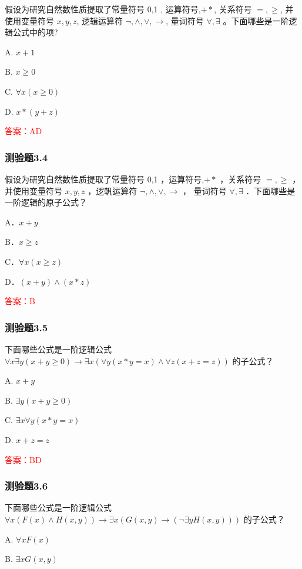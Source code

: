\documentclass[UTF8, heading=true]{ctexart}
\begin{document}
假设为研究自然数性质提取了常量符号 0,1 , 运算符号,$+ *$,
 关系符号 $=, \geq$, 并使用变量符号 $x, y, z$, 
 逻辑运算符 $\neg, \wedge, \vee, \rightarrow$, 量词符号 $\forall, \exists$ 。下面哪些是一阶逻辑公式中的项?

A. $ x+1$

B. $ x \geq 0$

C. $\forall x(x \geq 0)$

D. $ x *(y+z)$

\textcolor{red}{答案：AD}

\subsubsection{测验题3.4}

假设为研究自然数性质提取了常量符号 0,1 ，运算符号,$+ *$ ，关系符号 $=, \geq$ ，
并使用变量符号 $x, y, z$ ，逻軓运算符 $\neg, \wedge, \vee, \rightarrow$ ，
量词符号 $\forall, \exists$ ．下面哪些是一阶逻辑的原子公式？

A．$ x+y$

B．$ x \geq z$

C．$\forall x(x \geq z)$

D．$(x+y) \wedge(x * z)$

\textcolor{red}{答案：B}

\subsubsection{测验题3.5}

下面哪些公式是一阶逻辑公式 $\forall x \exists y(x+y \geq 0) \rightarrow \exists x(\forall y(x * y=x) \wedge \forall z(x+z=z))$ 的子公式？

A. $
x+y
$


B. $
\exists y(x+y \geq 0)
$


C. $
\exists x \forall y(x * y=x)
$


D. $
x+z=z
$

\textcolor{red}{答案：BD}

\subsubsection{测验题3.6}

下面哪些公式是一阶逻辑公式 $\forall x(F(x) \wedge H(x, y)) \rightarrow \exists x(G(x, y) \rightarrow(\neg \exists y H(x, y)))$ 的子公式？

A. $
\forall x F(x)
$


B. $
\exists x G(x, y)
$
\end{document}
